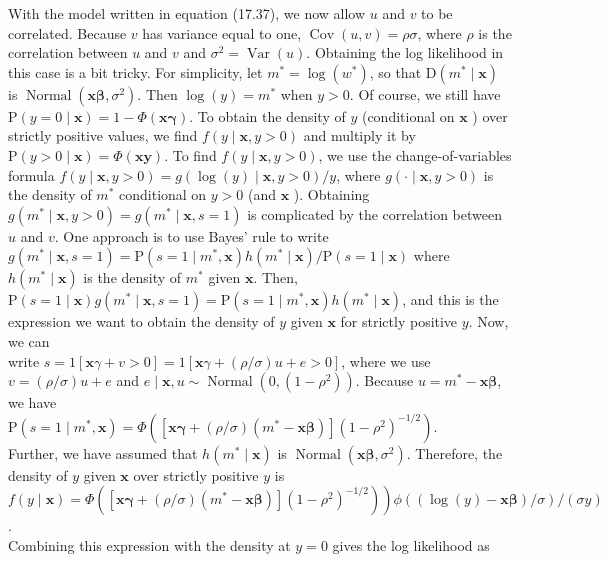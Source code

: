 \documentclass[10pt]{article}
\begin{document}
With the model written in equation (17.37), we now allow $u$ and $v$ to be correlated. Because $v$ has variance equal to one, $\operatorname{Cov}(u, v)=\rho \sigma$, where $\rho$ is the correlation between $u$ and $v$ and $\sigma^{2}=\operatorname{Var}(u)$. Obtaining the log likelihood in this case is a bit tricky. For simplicity, let $m^{*}=\log \left(w^{*}\right)$, so that $\mathrm{D}\left(m^{*} \mid \mathbf{x}\right)$ is $\operatorname{Normal}\left(\mathbf{x} \boldsymbol{\beta}, \sigma^{2}\right)$. Then $\log (y)=m^{*}$ when $y>0$. Of course, we still have $\mathrm{P}(y=0 \mid \mathbf{x})=1-\Phi(\mathbf{x} \boldsymbol{\gamma})$. To obtain the density of $y$ (conditional on $\mathbf{x}$ ) over strictly positive values, we find $f(y \mid \mathbf{x}, y>0)$ and multiply it by $\mathrm{P}(y>0 \mid \mathbf{x})=\Phi(\mathbf{x} \boldsymbol{y})$. To find $f(y \mid \mathbf{x}, y>0)$, we use the change-of-variables formula $f(y \mid \mathbf{x}, y>0)=g(\log (y) \mid \mathbf{x}, y>0) / y$, where $g(\cdot \mid \mathbf{x}, y>0)$ is the density of $m^{*}$ conditional on $y>0$ (and $\mathbf{x}$ ). Obtaining $g\left(m^{*} \mid \mathbf{x}, y>0\right)=g\left(m^{*} \mid \mathbf{x}, s=1\right)$ is complicated by the correlation between $u$ and $v$. One approach is to use Bayes' rule to write $g\left(m^{*} \mid \mathbf{x}, s=1\right)= \mathrm{P}\left(s=1 \mid m^{*}, \mathbf{x}\right) h\left(m^{*} \mid \mathbf{x}\right) / \mathrm{P}(s=1 \mid \mathbf{x})$ where $h\left(m^{*} \mid \mathbf{x}\right)$ is the density of $m^{*}$ given $\mathbf{x}$. Then, $\mathrm{P}(s=1 \mid \mathbf{x}) g\left(m^{*} \mid \mathbf{x}, s=1\right)=\mathrm{P}\left(s=1 \mid m^{*}, \mathbf{x}\right) h\left(m^{*} \mid \mathbf{x}\right)$, and this is the expression we want to obtain the density of $y$ given $\mathbf{x}$ for strictly positive $y$. Now, we can\\
write $s=1[\mathbf{x} \gamma+v>0]=1[\mathbf{x} \gamma+(\rho / \sigma) u+e>0]$, where we use $v=(\rho / \sigma) u+e$ and $e \mid \mathbf{x}, u \sim \operatorname{Normal}\left(0,\left(1-\rho^{2}\right)\right)$. Because $u=m^{*}-\mathbf{x} \boldsymbol{\beta}$, we have\\
$\mathrm{P}\left(s=1 \mid m^{*}, \mathbf{x}\right)=\Phi\left(\left[\mathbf{x} \boldsymbol{\gamma}+(\rho / \sigma)\left(m^{*}-\mathbf{x} \boldsymbol{\beta}\right)\right]\left(1-\rho^{2}\right)^{-1 / 2}\right)$.\\
Further, we have assumed that $h\left(m^{*} \mid \mathbf{x}\right)$ is $\operatorname{Normal}\left(\mathbf{x} \boldsymbol{\beta}, \sigma^{2}\right)$. Therefore, the density of $y$ given $\mathbf{x}$ over strictly positive $y$ is\\
$\left.f(y \mid \mathbf{x})=\Phi\left(\left[\mathbf{x} \boldsymbol{\gamma}+(\rho / \sigma)\left(m^{*}-\mathbf{x} \boldsymbol{\beta}\right)\right]\left(1-\rho^{2}\right)^{-1 / 2}\right)\right) \phi((\log (y)-\mathbf{x} \boldsymbol{\beta}) / \sigma) /(\sigma y)$.\\
Combining this expression with the density at $y=0$ gives the log likelihood as
\end{document}
